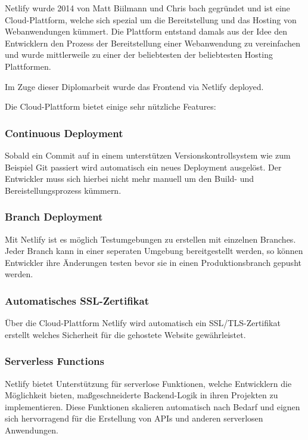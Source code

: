 
Netlify wurde 2014 von Matt Biilmann und Chris bach gegründet und ist eine Cloud-Plattform, welche sich spezial um die Bereitstellung und das Hosting von Webanwendungen kümmert. Die Plattform entstand damals aus der Idee den Entwicklern den Prozess der Bereitstellung einer Webanwendung zu vereinfachen und wurde mittlerweile zu einer der beliebtesten der beliebtesten Hosting Plattformen.
\cite{Netlify}

Im Zuge dieser Diplomarbeit wurde das Frontend via Netlify deployed.

Die Cloud-Plattform bietet einige sehr nützliche Features:

\subsubsection{Continuous Deployment}
Sobald ein Commit auf in einem unterstützen Versionskontrollsystem wie zum Beispiel Git passiert wird automatisch ein neues Deployment ausgelöst. Der Entwickler muss sich hierbei nicht mehr manuell um den Build- und Bereistellungsprozess kümmern.

\subsubsection{Branch Deployment}
Mit Netlify ist es möglich Testumgebungen zu erstellen mit einzelnen Branches. Jeder Branch kann in einer seperaten Umgebung bereitgestellt werden, so können Entwickler ihre Änderungen testen bevor sie in einen Produktionsbranch gepusht werden.

\subsubsection{Automatisches SSL-Zertifikat}
Über die Cloud-Plattform Netlify wird automatisch ein SSL/TLS-Zertifikat erstellt welches Sicherheit für die gehostete Website gewährleistet.

\subsubsection{Serverless Functions}
Netlify bietet Unterstützung für serverlose Funktionen, welche Entwicklern die Möglichkeit bieten, maßgeschneiderte Backend-Logik in ihren Projekten zu implementieren. Diese Funktionen skalieren automatisch nach Bedarf und eignen sich hervorragend für die Erstellung von APIs und anderen serverlosen Anwendungen.

\cite{Was_ist_Netlify}
